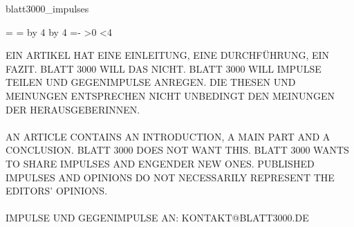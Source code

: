 \documentclass{article}
\makeatletter
\newcommand{\blattReleaseImpulsesFile}{blatt3000_impulses}
\newcommand{\blattRelease}{blatt3000_release_example}
\newcommand{\checkmultipleoffour}{%
  \newpage
  \count@=\the\c@page
  \@tempcnta=\count@
  \divide\@tempcnta by 4
  \multiply\@tempcnta by 4
  \count@=\numexpr\count@-\@tempcnta\relax
  \ifnum\count@>0
    \pagestyle{empty}
    \loop\ifnum\count@<4
      \null\clearpage
      \advance\count@\@ne
    \repeat
  \fi
}
\makeatother
\begin{document}
  \restoregeometry

  \newpage



  \normalfont\normalsize

  {\blattReleaseImpulsesFile}

  \checkmultipleoffour


  \newpage



  \vspace*{\fill}

  \begin{singlespace*}
    \normalfont\scriptsize EIN ARTIKEL HAT EINE EINLEITUNG, EINE DURCHFÜHRUNG, EIN FAZIT. BLATT 3000 WILL DAS NICHT. BLATT 3000 WILL IMPULSE TEILEN UND GEGENIMPULSE ANREGEN. DIE THESEN UND MEINUNGEN ENTSPRECHEN NICHT UNBEDINGT DEN MEINUNGEN DER HERAUSGEBERINNEN. \\\\
    AN ARTICLE CONTAINS AN INTRODUCTION, A MAIN PART AND A CONCLUSION. BLATT 3000 DOES NOT WANT THIS. BLATT 3000 WANTS TO SHARE IMPULSES AND ENGENDER NEW ONES. PUBLISHED IMPULSES AND OPINIONS DO NOT NECESSARILY REPRESENT THE EDITORS’ OPINIONS. \\\\
    IMPULSE UND GEGENIMPULSE AN: KONTAKT@BLATT3000.DE\\\\
    \listofbiographies
  \end{singlespace*}

  \newpage

  \restoregeometry


  \clearpage

\end{document}

